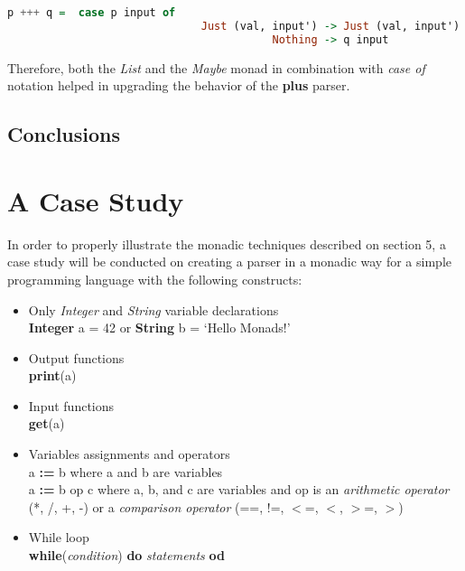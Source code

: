\documentclass[a4paper, onecolumn]{article}
\begin{document}
     \begin{tcolorbox}
    \begin{lstlisting}[language=Haskell] 
        p +++ q =  case p input of
                              Just (val, input') -> Just (val, input')
                                         Nothing -> q input
    \end{lstlisting}
    \end{tcolorbox}
    
    Therefore, both the \textit{List} and the \textit{Maybe} monad in combination with \textit{case of} notation helped in upgrading the behavior of the \textbf{plus} parser. 
    
    
    \subsection{Conclusions}
    
    \section{A Case Study}
    
    In order to properly illustrate the monadic techniques described on section 5, a case study will be conducted on creating a parser in a monadic way for a simple programming language with the following constructs: 
    
    \begin{itemize}
        \item Only \textit{Integer} and \textit{String} variable declarations \\
        \textbf{Integer} a = 42 or \textbf{String} b = `Hello Monads!'
        \item Output functions \\ 
        \textbf{print}(a)
        \item Input functions \\
        \textbf{get}(a)
        \item Variables assignments and operators \\ 
        a \textbf{:=} b where a and b are variables \\ 
        a \textbf{:=} b op c where a, b, and c are variables and op is an \textit{arithmetic operator} (*, /, +, -) or a \textit{comparison operator} (==, !=, $<$=, $<$, $>$=, $>$) 
        \item While loop \\ 
        \textbf{while}(\textit{condition}) \textbf{do} \textit{statements} \textbf{od}
    \end{itemize}
    
\end{document}

